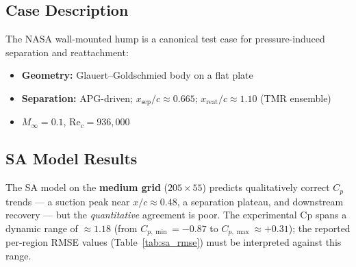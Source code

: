 \documentclass[11pt,a4paper]{article}
\begin{document}
\subsection{Case Description}

The NASA wall-mounted hump \cite{Greenblatt2006} is a canonical test case for
pressure-induced separation and reattachment:
\begin{itemize}
  \item \textbf{Geometry:} Glauert--Goldschmied body on a flat plate
  \item \textbf{Separation:} APG-driven; $x_\text{sep}/c \approx 0.665$;
    $x_\text{reat}/c \approx 1.10$ (TMR ensemble)
  \item $M_\infty = 0.1$, $\text{Re}_c = 936{,}000$
\end{itemize}

\subsection{SA Model Results}

The SA model on the \textbf{medium grid} ($205\times55$) predicts qualitatively
correct $C_p$ trends --- a suction peak near $x/c \approx 0.48$, a separation
plateau, and downstream recovery --- but the \emph{quantitative} agreement is
poor. The experimental Cp spans a dynamic range of $\approx 1.18$ (from
$C_{p,\min} = -0.87$ to $C_{p,\max} \approx +0.31$); the reported per-region
RMSE values (Table~\ref{tab:sa_rmse}) must be interpreted against this range.
\end{document}
